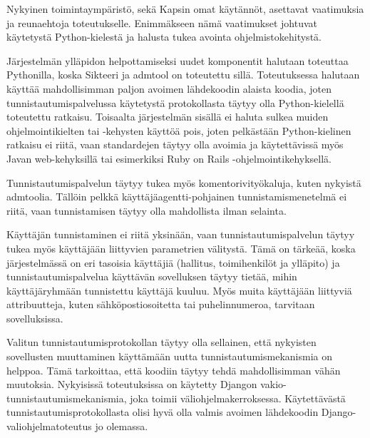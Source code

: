 Nykyinen toimintaympäristö, sekä Kapsin omat käytännöt, asettavat vaatimuksia ja reunaehtoja toteutukselle. Enimmäkseen nämä vaatimukset johtuvat käytetystä Python-kielestä ja halusta tukea avointa ohjelmistokehitystä.

Järjestelmän ylläpidon helpottamiseksi uudet komponentit halutaan toteuttaa Pythonilla, koska Sikteeri ja admtool on toteutettu sillä. Toteutuksessa halutaan käyttää mahdollisimman paljon avoimen lähdekoodin alaista koodia, joten tunnistautumispalvelussa käytetystä protokollasta täytyy olla Python-kielellä toteutettu ratkaisu. Toisaalta järjestelmän sisällä ei haluta sulkea muiden ohjelmointikielten tai -kehysten käyttöä pois, joten pelkästään Python-kielinen ratkaisu ei riitä, vaan standardejen täytyy olla avoimia ja käytettävissä myös Javan web-kehyksillä tai esimerkiksi Ruby on Rails -ohjelmointikehyksellä.

Tunnistautumispalvelun täytyy tukea myös komentorivityökaluja, kuten nykyistä admtoolia. Tällöin pelkkä käyttäjäagentti-pohjainen tunnistamismenetelmä ei riitä, vaan tunnistamisen täytyy olla mahdollista ilman selainta.

Käyttäjän tunnistaminen ei riitä yksinään, vaan tunnistautumispalvelun täytyy tukea myös käyttäjään liittyvien parametrien välitystä. Tämä on tärkeää, koska järjestelmässä on eri tasoisia käyttäjiä (hallitus, toimihenkilöt ja ylläpito) ja tunnistautumispalvelua käyttävän sovelluksen täytyy tietää, mihin käyttäjäryhmään tunnistettu käyttäjä kuuluu. Myös muita käyttäjään liittyviä attribuutteja, kuten sähköpostiosoitetta tai puhelinnumeroa, tarvitaan sovelluksissa.

Valitun tunnistautumisprotokollan täytyy olla sellainen, että nykyisten sovellusten muuttaminen käyttämään uutta tunnistautumismekanismia on helppoa. Tämä tarkoittaa, että koodiin täytyy tehdä mahdollisimman vähän muutoksia. Nykyisissä toteutuksissa on käytetty Djangon vakio-tunnistautumismekanismia, joka toimii väliohjelmakerroksessa. Käytettävästä tunnistautumisprotokollasta olisi hyvä olla valmis avoimen lähdekoodin Django-valiohjelmatoteutus jo olemassa.